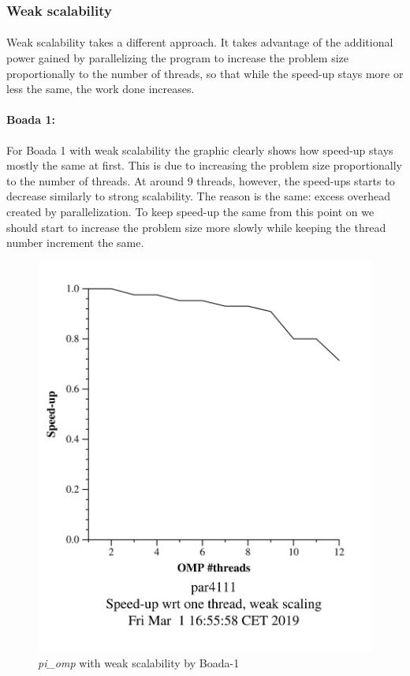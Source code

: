 \documentclass[12]{article}
\begin{document}
\bigskip
\subsubsection{Weak scalability}
\paragraph{}

Weak scalability takes a different approach. It takes advantage of the additional power gained by parallelizing the program to increase the problem size proportionally to the number of threads, so that while the speed-up stays more or less the same, the work done increases.

\paragraph{Boada 1:}
For Boada 1 with weak scalability the graphic clearly shows how speed-up stays mostly the same at first. This is due to increasing the problem size proportionally to the number of threads. At around 9 threads, however, the speed-ups starts to decrease similarly to strong scalability. The reason is the same: excess overhead created by parallelization. To keep speed-up the same from this point on we should start to increase the problem size more slowly while keeping the thread number increment the same. 
\begin{figure}[H]
\centering
\includegraphics[scale=0.15]{images/pi_omp-100000000-1-12-3-weak-boada-1.png}
 \caption{ \textit{pi\_omp} with weak scalability by Boada-1}
  \label{fig:pi_weak_ompboada1}
\end{figure}
\end{document}
